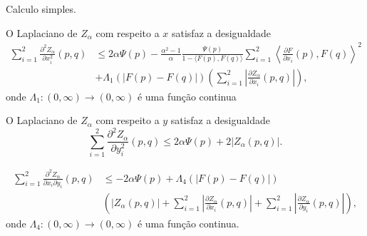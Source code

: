 \begin{demonstracao}
	Calculo simples.
\end{demonstracao}

\begin{lema}
	O Laplaciano de $Z_{\alpha}$ com respeito a $x$ satisfaz a desigualdade
	\begin{equation*}
		\begin{split}
		\sum_{i=1}^{2} \frac{\partial^2 Z_{\alpha}}{\partial x_i^2} (p,q) & \leq 2 \alpha \Psi(p) - \frac{\alpha^2 - 1}{\alpha} \frac{\Psi(p)}{1 - \langle F(p), F(q) \rangle} \sum_{i=1}^{2} \left\langle \frac{\partial F}{\partial x_i} (p), F(q) \right\rangle^2\\
		& + \Lambda_1 (| F(p) - F(q) |) \left( \sum_{i=1}^{2} \left| \frac{\partial Z_{\alpha}}{\partial x_i} (p,q) \right| \right),
		\end{split}		
	\end{equation*}
	onde $\Lambda_1: (0,\infty) \rightarrow (0,\infty)$ é uma função continua
\end{lema}



\begin{lema}
	O Laplaciano de $Z_{\alpha}$ com respeito a $y$ satisfaz a desigualdade
	\begin{equation*}
		\sum_{i=1}^{2} \frac{\partial^2 Z_{\alpha}}{\partial y_i^2} (p,q) \leq 2 \alpha \Psi(p) + 2 |Z_{\alpha}(p,q)|.
	\end{equation*}
\end{lema}

\begin{lema}
	\begin{equation*}
		\begin{split}
		\sum_{i=1}^{2} \frac{\partial^2 Z_{\alpha}}{\partial x_i \partial y_i} (p,q) &\leq -2 \alpha \Psi(p) + \Lambda_4 (|F(p) - F(q)|)\\
		& \left( |Z_{\alpha}(p,q)| + \sum_{i=1}^{2} \left| \frac{\partial Z_{\alpha}}{\partial x_i} (p,q) \right| + \sum_{i=1}^{2} \left| \frac{\partial Z_{\alpha}}{\partial y_i} (p,q) \right| \right),
		\end{split}		
	\end{equation*}
	onde $\Lambda_4: (0,\infty) \rightarrow (0,\infty)$ é uma função continua.
\end{lema}

